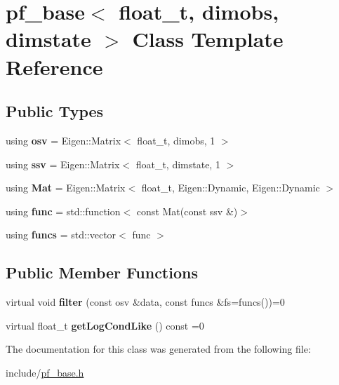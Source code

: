 \hypertarget{classpf__base}{}\section{pf\+\_\+base$<$ float\+\_\+t, dimobs, dimstate $>$ Class Template Reference}
\label{classpf__base}
\subsection*{Public Types}
\begin{DoxyCompactItemize}
\item 
\mbox{\label{classpf__base_ab468bc1a4c41a4ad7372281a1db7db8b}} 
using {\bfseries osv} = Eigen\+::\+Matrix$<$ float\+\_\+t, dimobs, 1 $>$
\item 
\mbox{\label{classpf__base_add01ddbbba6953260f53d47bae2888d2}} 
using {\bfseries ssv} = Eigen\+::\+Matrix$<$ float\+\_\+t, dimstate, 1 $>$
\item 
\mbox{\label{classpf__base_a6b7fbe89aa5e34880ad81a5f48e82a04}} 
using {\bfseries Mat} = Eigen\+::\+Matrix$<$ float\+\_\+t, Eigen\+::\+Dynamic, Eigen\+::\+Dynamic $>$
\item 
\mbox{\label{classpf__base_ae409bcfbd5e1bc542134c4e9b6dce6c3}} 
using {\bfseries func} = std\+::function$<$ const Mat(const ssv \&)$>$
\item 
\mbox{\label{classpf__base_a0c328d66f991393ec0f1a082d5cbf4a6}} 
using {\bfseries funcs} = std\+::vector$<$ func $>$
\end{DoxyCompactItemize}
\subsection*{Public Member Functions}
\begin{DoxyCompactItemize}
\item 
\mbox{\label{classpf__base_aec857789031fd938b7088faa3607707a}} 
virtual void {\bfseries filter} (const osv \&data, const funcs \&fs=funcs())=0
\item 
\mbox{\label{classpf__base_a350df818820d6ab0fd6d413022b7f23b}} 
virtual float\+\_\+t {\bfseries get\+Log\+Cond\+Like} () const =0
\end{DoxyCompactItemize}


The documentation for this class was generated from the following file\+:\begin{DoxyCompactItemize}
\item 
include/\hyperlink{pf__base_8h}{pf\+\_\+base.\+h}\end{DoxyCompactItemize}
